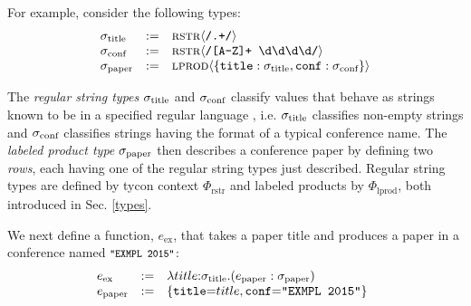 \documentclass[preprint]{sigplanconf}
\begin{document}
For example, consider the following types:
\[\begin{array}{lcl}
\sigma_\text{title} & := & {\textsc{rstr}}\langle\texttt{/.+/}\rangle\\
\sigma_\text{conf} & := & {\textsc{rstr}}\langle\texttt{/[A-Z]+ \textbackslash d\textbackslash d\textbackslash d\textbackslash d/}\rangle\\
\sigma_\text{paper} & := & {\textsc{lprod}}\langle\{\texttt{title} : \sigma_\text{title}, \texttt{conf} : \sigma_\text{conf}\}\rangle\end{array}\]

The \emph{regular string types} $\sigma_\text{title}$ and $\sigma_\text{conf}$ classify values that behave as strings known to be in a specified regular language \cite{sanitation-psp14}, i.e. $\sigma_\text{title}$ classifies {non-empty strings} and $\sigma_\text{conf}$ classifies strings having the format of a typical conference name. The \emph{labeled product type} $\sigma_\text{paper}$ then describes a conference paper by defining two \emph{rows}, each having one of the regular string types just described. Regular string types are defined by  tycon context $\Phi_\text{rstr}$ and labeled products by $\Phi_\text{lprod}$, both introduced in Sec. \ref{types}.%

We next define a function, $e_\text{ex}$, that takes a paper title and produces a paper in a conference named $\small\concstr{EXMPL 2015}$: %
\[\hspace{-5px}\begin{array}{lcl}
e_\text{ex} & := & \elam{\stx{title}}{title}{(e_\text{paper} : \stx{paper})}\\
e_\text{paper} & := & \{\conclbl{title}{=}title, \conclbl{conf}{=}\texttt{"EXMPL 2015"}\}
\end{array}\]
\end{document}
